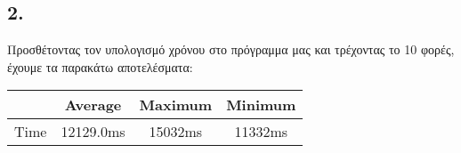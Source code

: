 \documentclass{article}
\begin{document}
\subsection*{2.}

Προσθέτοντας τον υπολογισμό χρόνου στο πρόγραμμα μας και τρέχοντας το 10 φορές, έχουμε τα παρακάτω αποτελέσματα: \\
\begin{otherlanguage}{english}
    \begin{center}
        \begin{tabular}{|c|c|c|c|}\hline
            & Average & Maximum & Minimum \\ \hline
            Time &  12129.0ms & 15032ms & 11332ms\\ \hline
       \end{tabular}
    \end{center}
    \end{otherlanguage}
\end{document}
